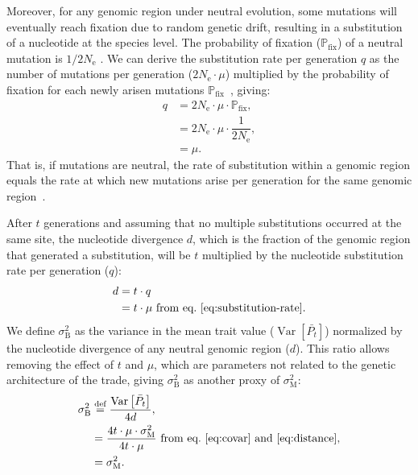 \documentclass{article}
\newcommand{\defEqual}{\stackrel{\text{def}}{=}}
\newcommand{\Multiply}{\cdot}
\DeclareMathOperator{\Var}{\text{Var}}
\newcommand{\Ne}{N_{\text{e}}}
\newcommand{\proba}{\mathbb{P}}
\newcommand{\pfix}{\proba_{\text{fix}}}
\newcommand{\Time}{t}
\newcommand{\Trait}{P}
\newcommand{\MeanTrait}{\bar{\Trait_{\Time}}}
\newcommand{\VarPhy}{\Var \left[\MeanTrait\right]}
\newcommand{\MutationRate}{\mu}
\newcommand{\SubRate}{q}
\newcommand{\RateMut}{\sigma^2_{\mathrm{M}}}
\newcommand{\RateBetween}{\sigma^2_{\mathrm{B}}}
\begin{document}
Moreover, for any genomic region under neutral evolution, some mutations will eventually reach fixation due to random genetic drift, resulting in a substitution of a nucleotide at the species level.
The probability of fixation ($\pfix$) of a neutral mutation is $1/2\Ne$ \parencite{kimura_probability_1962}.
We can derive the substitution rate per generation $\SubRate$ as the number of mutations per generation ($2\Ne \Multiply \MutationRate$) multiplied by the probability of fixation for each newly arisen mutations $\pfix$~\parencite{mccandlish_modeling_2014}, giving:
\begin{align}
    \SubRate & = 2 \Ne \Multiply \MutationRate \Multiply \pfix, \\
    & = 2 \Ne  \Multiply \MutationRate  \Multiply \dfrac{1}{2\Ne}, \\
    & = \MutationRate. \label{eq:substitution-rate}
\end{align}
That is, if mutations are neutral, the rate of substitution within a genomic region equals the rate at which new mutations arise per generation for the same genomic region~\parencite{kimura_evolutionary_1968}.

After $\Time$ generations and assuming that no multiple substitutions occurred at the same site, the nucleotide divergence $d$, which is the fraction of the genomic region that generated a substitution, will be $\Time$ multiplied by the nucleotide substitution rate per generation ($\SubRate$):
\begin{align}
    d & = \Time \Multiply \SubRate \\
    & = \Time \Multiply \MutationRate \text{ from eq.~\ref{eq:substitution-rate}}. \label{eq:distance}
\end{align}
We define $\RateBetween$ as the variance in the mean trait value ($\VarPhy$) normalized by the nucleotide divergence of any neutral genomic region ($d$).
This ratio allows removing the effect of $\Time$ and $\MutationRate$, which are parameters not related to the genetic architecture of the trade, giving $\RateBetween$ as another proxy of $\RateMut$:
\begin{align}
    \RateBetween & \defEqual \frac{\VarPhy}{4 d},\\
    & = \frac{4 \Time \Multiply \MutationRate \Multiply \RateMut}{4 \Time \Multiply \MutationRate}\text{ from eq.~\ref{eq:covar} and~\ref{eq:distance}}, \\
    & = \RateMut \label{eq:rate-phy}.
\end{align}
\end{document}
